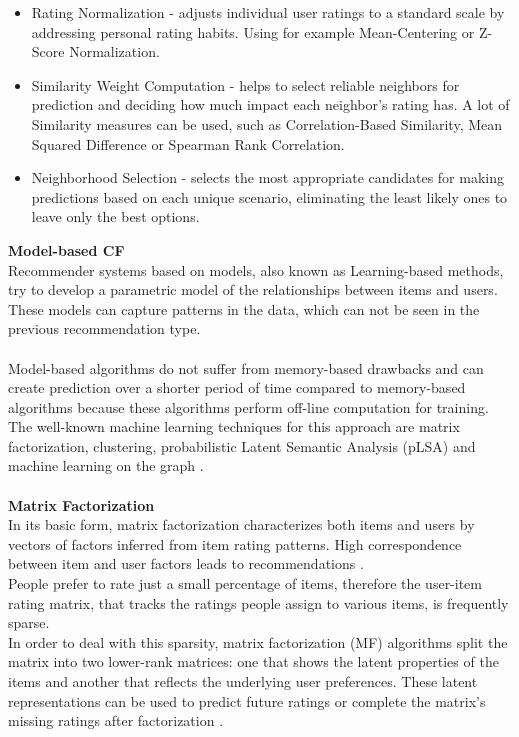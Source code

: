 \documentclass[\myFontSize,oneside,english,hidelinks,a4paper]{article}
\begin{document}
\begin{itemize}
\item Rating Normalization - adjusts individual user ratings to a standard scale by addressing personal rating habits. Using for example Mean-Centering or Z-Score Normalization. 
\item Similarity Weight Computation - helps to select reliable neighbors for prediction and deciding how much impact each neighbor's rating has. A lot of Similarity measures can be used, such as Correlation-Based Similarity, Mean Squared Difference or Spearman Rank Correlation. 
\item Neighborhood Selection - selects the most appropriate candidates for making predictions based on each unique scenario, eliminating the least likely ones to leave only the best options. \cite{Ning201537}
\end{itemize}
%
%
\textbf{Model-based CF}\\
Recommender systems based on models, also known as Learning-based methods, try to develop a parametric model of the relationships between items and users. These models can capture patterns in the data, which can not be seen in the previous recommendation type. \\\\
Model-based algorithms do not suffer from memory-based drawbacks and can create prediction over a shorter period of time compared to memory-based algorithms because these algorithms perform off-line computation for training. 
The well-known machine learning techniques for this approach are matrix factorization, clustering, probabilistic Latent Semantic Analysis (pLSA) and machine learning on the graph \cite{NILASHI2018507}. \\\\
%
%
%
\textbf{Matrix Factorization}\\
In its basic form, matrix factorization characterizes both items and users by vectors of factors inferred from item rating patterns. High correspondence between item and user factors leads to recommendations \cite{5197422}. \\
People prefer to rate just a small percentage of items, therefore the user-item rating matrix, that tracks the ratings people assign to various items, is frequently sparse.\\
In order to deal with this sparsity, matrix factorization (MF) algorithms split the matrix into two lower-rank matrices: one that shows the latent properties of the items and another that reflects the underlying user preferences. These latent representations can be used to predict future ratings or complete the matrix's missing ratings after factorization \cite{Tokala2023}.\\\\
\end{document}
